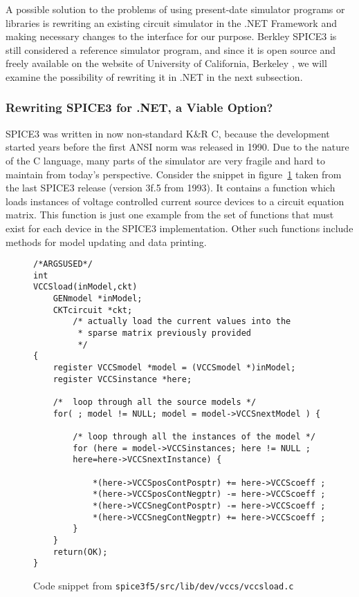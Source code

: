 A possible solution to the problems of using present-date simulator programs or libraries is rewriting an existing circuit simulator in the .NET Framework and making necessary changes to the interface for our purpose. Berkley SPICE3 is still considered a reference simulator program, and since it is open source and freely available on the website of University of California, Berkeley \cite{spice3f5}, we will examine the possibility of rewriting it in .NET in the next subsection.

\subsubsection*{Rewriting SPICE3 for .NET, a Viable Option?}

SPICE3 was written in now non-standard K\&R C, because the development started years before the first ANSI norm was released in 1990. Due to the nature of the C language, many parts of the simulator are very fragile and hard to maintain from today's perspective. Consider the snippet in figure~\ref{fig:vccs_snippet} taken from the last SPICE3 release (version 3f.5 from 1993). It contains a function which loads instances of voltage controlled current source devices to a circuit equation matrix. This function is just one example from the set of functions that must exist for each device in the SPICE3 implementation. Other such functions include methods for model updating and data printing.

\begin{figure}[h]
	\begin{verbatim}
/*ARGSUSED*/
int
VCCSload(inModel,ckt)
	GENmodel *inModel;
	CKTcircuit *ckt;
		/* actually load the current values into the 
		 * sparse matrix previously provided 
		 */
{
	register VCCSmodel *model = (VCCSmodel *)inModel;
	register VCCSinstance *here;
	
	/*  loop through all the source models */
	for( ; model != NULL; model = model->VCCSnextModel ) {
		
		/* loop through all the instances of the model */
		for (here = model->VCCSinstances; here != NULL ;
		here=here->VCCSnextInstance) {
			
			*(here->VCCSposContPosptr) += here->VCCScoeff ;
			*(here->VCCSposContNegptr) -= here->VCCScoeff ;
			*(here->VCCSnegContPosptr) -= here->VCCScoeff ;
			*(here->VCCSnegContNegptr) += here->VCCScoeff ;
		}
	}
	return(OK);
}
	\end{verbatim}
	\caption{Code snippet from \texttt{spice3f5/src/lib/dev/vccs/vccsload.c}}
	\label{fig:vccs_snippet}
\end{figure}

